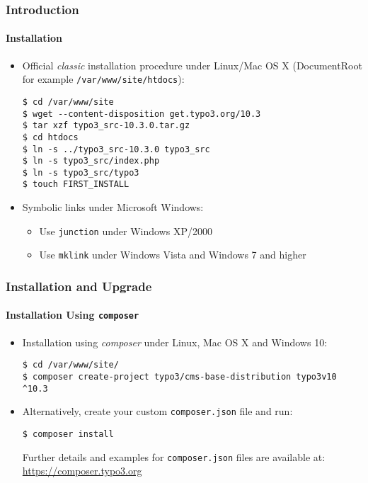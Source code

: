 
\begin{frame}[fragile]
	\frametitle{Introduction}
	\framesubtitle{Installation}

	\begin{itemize}
		\item Official \textit{classic} installation procedure under Linux/Mac OS X\newline
			(DocumentRoot for example \texttt{/var/www/site/htdocs}):
\begin{lstlisting}
$ cd /var/www/site
$ wget --content-disposition get.typo3.org/10.3
$ tar xzf typo3_src-10.3.0.tar.gz
$ cd htdocs
$ ln -s ../typo3_src-10.3.0 typo3_src
$ ln -s typo3_src/index.php
$ ln -s typo3_src/typo3
$ touch FIRST_INSTALL
\end{lstlisting}

		\item Symbolic links under Microsoft Windows:

			\begin{itemize}
				\item Use \texttt{junction} under Windows XP/2000
				\item Use \texttt{mklink} under Windows Vista and Windows 7 and higher
			\end{itemize}

	\end{itemize}
\end{frame}


\begin{frame}[fragile]
	\frametitle{Installation and Upgrade}
	\framesubtitle{Installation Using \texttt{composer}}

	\begin{itemize}
		\item Installation using \textit{composer} under Linux, Mac OS X and Windows 10:
\begin{lstlisting}
$ cd /var/www/site/
$ composer create-project typo3/cms-base-distribution typo3v10 ^10.3
\end{lstlisting}

		\item Alternatively, create your custom \texttt{composer.json} file and run:
\begin{lstlisting}
$ composer install
\end{lstlisting}

			Further details and examples for \texttt{composer.json} files are available at:\newline
			\smaller
				\href{https://composer.typo3.org}{https://composer.typo3.org}
			\normalsize

	\end{itemize}
\end{frame}

